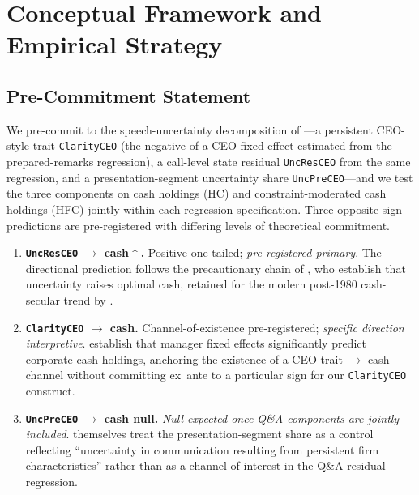 
\section{Conceptual Framework and Empirical Strategy}
\label{sec:framework}

\subsection{Pre-Commitment Statement}
\label{sec:framework:precommit}

We pre-commit to the speech-uncertainty decomposition of ---a persistent CEO-style trait \texttt{ClarityCEO} (the negative of a CEO fixed effect estimated from the prepared-remarks regression), a call-level state residual \texttt{UncResCEO} from the same regression, and a presentation-segment uncertainty share \texttt{UncPreCEO}---and we test the three components on cash holdings (HC) and constraint-moderated cash holdings (HFC) jointly within each regression specification. Three opposite-sign predictions are pre-registered with differing levels of theoretical commitment.

\begin{enumerate}
\item \textbf{\texttt{UncResCEO} $\to$ cash$\uparrow$.} Positive one-tailed; \emph{pre-registered primary}. The directional prediction follows the precautionary chain of , who establish that uncertainty raises optimal cash, retained for the modern post-1980 cash-secular trend by .
\item \textbf{\texttt{ClarityCEO} $\to$ cash.} Channel-of-existence pre-registered; \emph{specific direction interpretive}.  establish that manager fixed effects significantly predict corporate cash holdings, anchoring the existence of a CEO-trait $\to$ cash channel without committing ex~ante to a particular sign for our \texttt{ClarityCEO} construct.
\item \textbf{\texttt{UncPreCEO} $\to$ cash null.} \emph{Null expected once Q\&A components are jointly included}. \citeauthor{dzielinski2021} themselves treat the presentation-segment share as a control reflecting ``uncertainty in communication resulting from persistent firm characteristics'' rather than as a channel-of-interest in the Q\&A-residual regression.
\end{enumerate}

